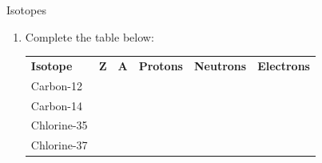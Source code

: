             \begin{exercises}{  Isotopes }
            \nopagebreak
        \label{m38753*id258699}\begin{enumerate}[noitemsep, label=\textbf{\arabic*}. ] 
            \label{m38753*uid69}\item Complete the table below:
          \begin{table}[H]
        \begin{center}
      \label{m38753*id258715}
    \noindent
      \tablelasttail{}
      \begin{xtabular}[t]{|l|l|l|l|l|l|}\hline
        \textbf{Isotope} &
        \textbf{Z} &
        \textbf{A} &
        \textbf{Protons} &
        \textbf{Neutrons} &
        \textbf{Electrons}%
     \tabularnewline{}
        Carbon-12 &
         &
         &
         &
         &
     \tabularnewline{}
        Carbon-14 &
         &
         &
         &
         &
     \tabularnewline{}
        Chlorine-35 &
         &
         &
         &
         &
     \tabularnewline{}
        Chlorine-37 &
         &
         &
         &
         &
     \tabularnewline{}
    \end{xtabular}
      \end{center}
\end{table}
    \par

\end{enumerate}
\end{exercises}
